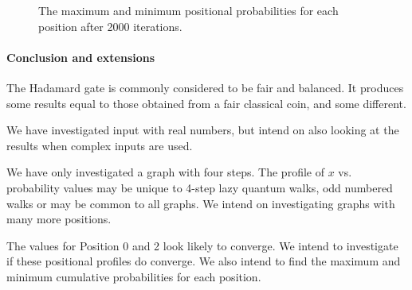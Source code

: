 \documentclass[a0,portrait]{a0poster}
\begin{document}
\begin{center}
{\begin{figure}
\caption{The maximum and minimum positional probabilities for each position after 2000 iterations.}
\label{quan_max}
\end{figure}    

\paragraph{Conclusion and extensions}

The Hadamard gate is commonly considered to be fair and balanced. It produces some results equal to those obtained from a fair classical coin, and some different.

We have investigated input with real numbers, but intend on also looking at the results when complex inputs are used.

We have only investigated a graph with four steps. The profile of $x$ vs. probability values may be unique to 4-step lazy quantum walks, odd numbered walks or may be common to all graphs. We intend on investigating graphs with many more positions.

The values for Position 0 and 2 look likely to converge. We intend to investigate if these positional profiles do converge. We also intend to find the maximum and minimum cumulative probabilities for each position.


}
\end{center}


\makefooter
\end{document}
